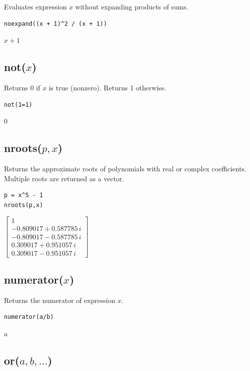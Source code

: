 \documentclass[12pt]{article}
\begin{document}
Evaluates expression $x$ without expanding products of sums.

{\color{blue}
\begin{verbatim}
noexpand((x + 1)^2 / (x + 1))
\end{verbatim}
}

\noindent
$x + 1$

\subsection*{not($x$)}

Returns 0 if $x$ is true (nonzero).
Returns 1 otherwise.

{\color{blue}
\begin{verbatim}
not(1=1)
\end{verbatim}
}

\noindent
$0$

\subsection*{nroots($p,x$)}

Returns the approximate roots of polynomials with real or complex coefficients.
Multiple roots are returned as a vector.

{\color{blue}
\begin{verbatim}
p = x^5 - 1
nroots(p,x)
\end{verbatim}
}

\noindent
$\displaystyle
\begin{bmatrix}
1
\\[1ex]
-0.809017 + 0.587785\,i
\\[1ex]
-0.809017 - 0.587785\,i
\\[1ex]
0.309017 + 0.951057\,i
\\[1ex]
0.309017 - 0.951057\,i
\end{bmatrix}
$

\subsection*{numerator($x$)}

Returns the numerator of expression $x$.

{\color{blue}
\begin{verbatim}
numerator(a/b)
\end{verbatim}
}

\noindent
$a$

\subsection*{or($a,b,\ldots$)}
\end{document}
